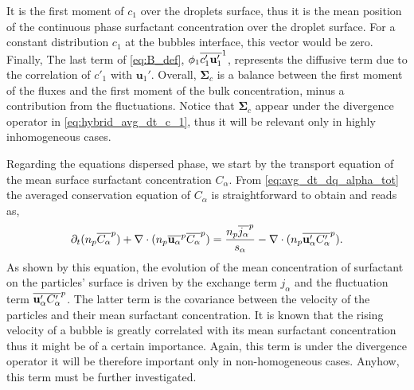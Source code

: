 It is the first moment of $c_1$ over the droplets surface, thus it is the mean position of the continuous phase surfactant concentration over the droplet surface.
For a constant distribution $c_1$ at the bubbles interface, this vector would be zero. 
Finally, The last term of \ref{eq:B_def}, $\phi_1\overline{c'_1\textbf{u}_1'}^1$, represents the diffusive term due to the correlation of $c'_1$ with $\textbf{u}_1'$.
Overall, $\mathbf{\Sigma}_c$ is a balance between the first moment of the fluxes and the first moment of the bulk concentration, minus a contribution from the fluctuations.
Notice that $\mathbf{\Sigma}_c$ appear under the divergence operator in \ref{eq:hybrid_avg_dt_c_1}, thus it will be relevant only in highly inhomogeneous cases. 

Regarding the equations dispersed phase, we start by the transport equation of the mean surface surfactant concentration $C_\alpha$.
From \ref{eq:avg_dt_dq_alpha_tot} the averaged conservation equation of $C_\alpha$ is straightforward to obtain and reads as,
\begin{equation}
    \partial_t (n_p\overline{C_\alpha}^{p})
    + \mathbf{\nabla} \cdot (n_p\overline{\textbf{u}_\alpha}^{p} \overline{C_\alpha}^{p})
    =
    \frac{n_p\overline{j_\alpha}^{p}}{s_\alpha}
    - \mathbf{\nabla} \cdot (n_p\overline{\textbf{u}_\alpha' C'_\alpha}^{p}).
    \label{eq:avg_dt_dC_alpha}
\end{equation}
As shown by this equation, the evolution of the mean concentration of surfactant on the particles' surface is driven by the exchange term $j_\alpha$ and the fluctuation term $\overline{\textbf{u}_\alpha' C_\alpha'}^{p}$. 
The latter term is the covariance between the velocity of the particles and their mean surfactant concentration. 
It is known that the rising velocity of a bubble is greatly correlated with its mean surfactant concentration \citet{kentheswaran2022direct} thus it might be of a certain importance. 
Again, this term is under the divergence operator it will be therefore important only in non-homogeneous cases. 
Anyhow, this term must be further investigated.

